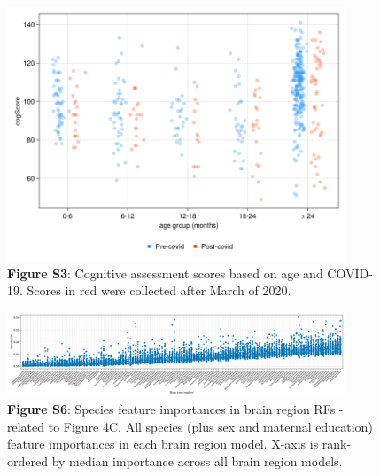 \documentclass{article}
\begin{document}
\begin{figure}[h]
    \centering
    \includegraphics[width=0.9\textwidth]{assets/Supp_Figure3.png}
    \captionsetup{labelformat=empty}
    \caption{
        \textbf{Figure S3}: Cognitive assessment scores based on age
        and COVID-19. Scores in red were collected after March of 2020.
    }
\end{figure}

\begin{figure}[h]
  \centering
  \includegraphics[width=0.9\textwidth]{assets/Supp_Figure5.png}
  \captionsetup{labelformat=empty}
  \caption{
      \textbf{Figure S6}: Species feature importances in brain region RFs - related to Figure 4C.
      All species (plus sex and maternal education) feature importances in each brain region model.
      X-axis is rank-ordered by median importance across all brain region models.
  }
\end{figure}
\end{document}
